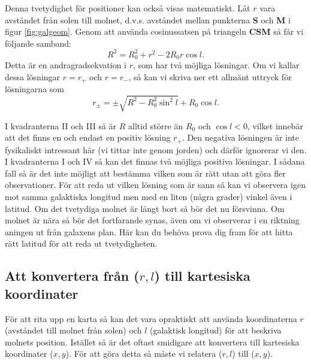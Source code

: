 Denna tvetydighet för positioner kan också visas matematiskt. Låt $r$ vara 
avståndet från solen till molnet, d.v.s. avståndet mellan punkterna {\bf
S} och {\bf M} i  figur \ref{fig:galgeom}. Genom att använda cosinussatsen
på triangeln {\bf CSM} så får vi följande samband:
\begin{equation}
R^2 = R_0^2 + r^2 - 2 R_0 r \cos l.
\end{equation}
Detta är en andragradsekvation i $r$, som har två möjliga lösningar. Om vi
kallar dessa lösningar $r=r_{+}$ och $r=r_{-}$, så kan vi skriva ner ett 
allmänt uttryck för lösningarna som 
\begin{equation}
\boxed{
r_\pm = \pm \sqrt{R^2 - R_0^2 \sin^2 l} + R_0\cos l .
}
\label{eqn:rpm}
\end{equation}

I kvadranterna II och III så är $R$ alltid större än $R_0$ och $\cos l <0$,
vilket innebär att det finns en och endast en positiv lösning $r_+$. Den 
negativa lösningen är inte fysikaliskt intressant här (vi tittar inte genom jorden) 
och därför ignorerar vi den. 
I kvadranterna I och IV så kan det finnas två möjliga positiva lösningar.
I sådana fall så är det inte möjligt att bestämma vilken som är rätt utan att göra
fler observationer. För att reda ut vilken lösning som är sann så kan vi observera
igen mot samma galaktiska longitud men med en liten (några grader) vinkel
även i latitud. Om det tvetydiga molnet är långt bort så bör det nu försvinna. Om
molnet är nära så bör det fortfarande synas, även om vi observerar i en riktning
aningen ut från galaxens plan. Här kan du behöva prova dig fram för att hitta 
rätt latitud för att reda ut tvetydigheten. 

\subsection{Att konvertera från ($r,l$) till kartesiska koordinater} 
För att rita upp en karta så kan det vara opraktiskt att använda koordinaterna
$r$ (avståndet till molnet från solen) och $l$ (galaktisk longitud) för att beskriva
molnets position. Istället så är det oftast smidigare att konvertera till kartesiska koordinater
($x,y$). För att göra detta så måste vi relatera ($r, l$) till ($x, y$). 

